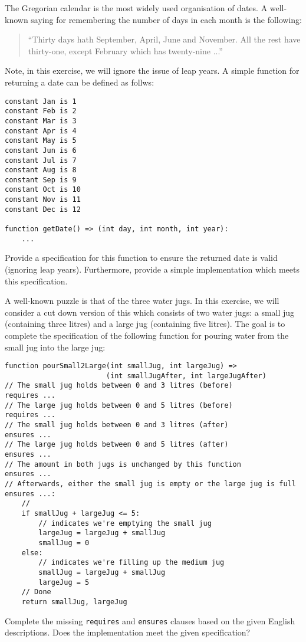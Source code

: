 \begin{ex}
The Gregorian calendar is the most widely used organisation of dates.
A well-known saying for remembering the number of days in each month
is the following:
\begin{quote}
``Thirty days hath September, April, June and November.  All the rest
have thirty-one, except February which has twenty-nine ...''
\end{quote}
Note, in this exercise, we will ignore the issue of leap years.  A
simple function for returning a date can be defined as follws:
\begin{lstlisting}
constant Jan is 1
constant Feb is 2
constant Mar is 3
constant Apr is 4
constant May is 5
constant Jun is 6
constant Jul is 7
constant Aug is 8
constant Sep is 9
constant Oct is 10
constant Nov is 11
constant Dec is 12

function getDate() => (int day, int month, int year):
    ...
\end{lstlisting}
Provide a specification for this function to ensure the returned date
is valid (ignoring leap years).  Furthermore, provide a simple
implementation which meets this specification.
\end{ex}

\begin{ex}
A well-known puzzle is that of the three water jugs.  In this
exercise, we will consider a cut down version of this which consists
of two water jugs: a small jug (containing three litres) and a large
jug (containing five litres).  The goal is to complete the
specification of the following function for pouring water from the
small jug into the large jug:

\begin{lstlisting}
function pourSmall2Large(int smallJug, int largeJug) => 
                        (int smallJugAfter, int largeJugAfter)
// The small jug holds between 0 and 3 litres (before)
requires ...
// The large jug holds between 0 and 5 litres (before)
requires ...
// The small jug holds between 0 and 3 litres (after)
ensures ...
// The large jug holds between 0 and 5 litres (after)
ensures ...
// The amount in both jugs is unchanged by this function
ensures ...
// Afterwards, either the small jug is empty or the large jug is full
ensures ...:
    //
    if smallJug + largeJug <= 5:
        // indicates we're emptying the small jug
        largeJug = largeJug + smallJug
        smallJug = 0
    else:
        // indicates we're filling up the medium jug    
        smallJug = largeJug + smallJug
        largeJug = 5
    // Done
    return smallJug, largeJug
\end{lstlisting}
Complete the missing \lstinline{requires} and \lstinline{ensures}
clauses based on the given English descriptions.  Does the implementation meet the given specification?
\end{ex}
